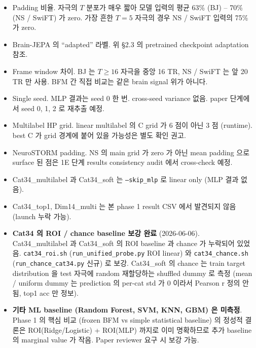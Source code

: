 \documentclass[a4paper,11pt]{article}
\begin{document}
\begin{itemize}[leftmargin=*, itemsep=2pt]
  \item Padding 비율. 자극의 $T$ 분포가 매우 짧아 모델 입력의 평균 63\% (BJ) -- 70\% (NS / SwiFT) 가 zero. 가장 흔한 $T=5$ 자극의 경우 NS / SwiFT 입력의 75\% 가 zero.
  \item Brain-JEPA 의 ``adapted'' 라벨. 위 \S2.3 의 pretrained checkpoint adaptation 참조.
  \item Frame window 차이. BJ 는 $T \geq 16$ 자극을 중앙 16 TR, NS / SwiFT 는 앞 20 TR 만 사용. BFM 간 직접 비교는 같은 brain signal 위가 아니다.
  \item Single seed. MLP 결과는 seed 0 한 번. cross-seed variance 없음. paper 단계에서 seed 0, 1, 2 로 재추출 예정.
  \item Multilabel HP grid. linear multilabel 의 C grid 가 6 점이 아닌 3 점 (runtime). best C 가 grid 경계에 붙어 있을 가능성은 별도 확인 권고.
  \item NeuroSTORM padding. NS 의 main grid 가 zero 가 아닌 mean padding 으로 surface 된 점은 1E 단계 results consistency audit 에서 cross-check 예정.
  \item Cat34\_multilabel 과 Cat34\_soft 는 \texttt{--skip\_mlp} 로 linear only (MLP 결과 없음).
  \item Cat34\_top1, Dim14\_multi 는 본 phase 1 result CSV 에서 발견되지 않음 (launch 누락 가능).
  \item \textbf{Cat34 의 ROI / chance baseline 보강 완료} (2026-06-06). Cat34\_multilabel 과 Cat34\_soft 의 ROI baseline 과 chance 가 누락되어 있었음. \texttt{cat34\_roi.sh} (\texttt{run\_unified\_probe.py} ROI linear) 와 \texttt{cat34\_chance.sh} (\texttt{run\_chance\_cat34.py} 신규) 로 보강. Cat34\_soft 의 chance 는 train target distribution 을 test 자극에 random 재할당하는 shuffled dummy 로 측정 (mean / uniform dummy 는 prediction 의 per-cat std 가 0 이라서 Pearson r 정의 안 됨, top1 acc 만 정보).
  \item \textbf{기타 ML baseline (Random Forest, SVM, KNN, GBM) 은 미측정}. Phase 1 의 핵심 비교 (frozen BFM vs simple statistical baseline) 의 정성적 결론은 ROI(Ridge/Logistic) + ROI(MLP) 까지로 이미 명확하므로 추가 baseline 의 marginal value 가 작음. Paper reviewer 요구 시 보강 가능.
\end{itemize}
\end{document}
